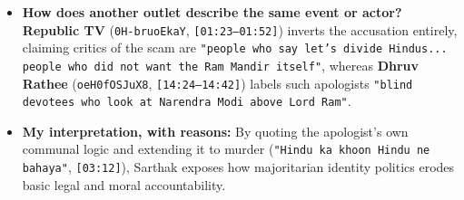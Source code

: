 \documentclass[10pt,a4paper]{article}
\begin{document}
\begin{itemize}[leftmargin=1.5em, itemsep=3pt, topsep=4pt]
  \item \textbf{How does another outlet describe the same event or actor?} \textbf{Republic TV} (\texttt{0H-bruoEkaY}, \texttt{[01:23--01:52]}) inverts the accusation entirely, claiming critics of the scam are \texttt{"people who say let's divide Hindus... people who did not want the Ram Mandir itself"}, whereas \textbf{Dhruv Rathee} (\texttt{oeH0fOSJuX8}, \texttt{[14:24--14:42]}) labels such apologists \texttt{"blind devotees who look at Narendra Modi above Lord Ram"}.
  \item \textbf{My interpretation, with reasons:} By quoting the apologist's own communal logic and extending it to murder (\texttt{"Hindu ka khoon Hindu ne bahaya"}, \texttt{[03:12]}), Sarthak exposes how majoritarian identity politics erodes basic legal and moral accountability.
\end{itemize}
\end{document}
